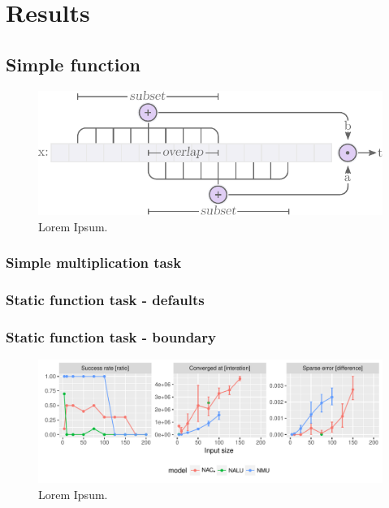 \section{Results}

\subsection{Simple function}

\begin{figure}[H]
\centering
\includegraphics[scale=1]{graphics/function_task_static_problem.pdf}
\caption{Lorem Ipsum.}
\end{figure}

\subsubsection{Simple multiplication task}


\subsubsection{Static function task - defaults}


\subsubsection{Static function task - boundary}
\begin{figure}[H]
\centering
\includegraphics[width=\linewidth]{results/simple_function_static_input_size.pdf}
\caption{Lorem Ipsum.}
\end{figure}

